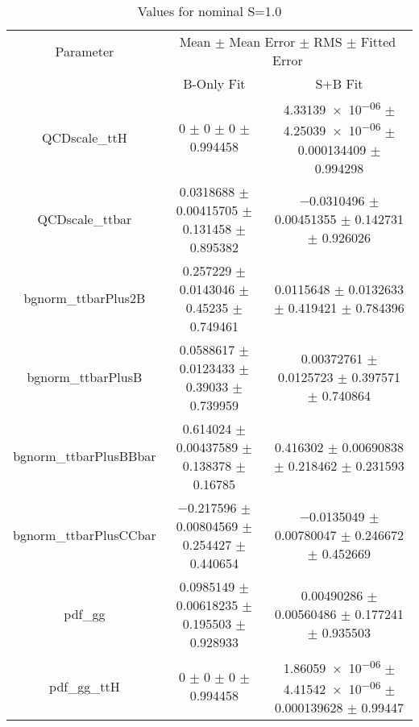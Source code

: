 \begin{table}
\centering
\caption{Values for nominal S=1.0}
\begin{tabular}{ccc}
\toprule
Parameter & \multicolumn{2}{c}{Mean $\pm$ Mean Error $\pm$ RMS $\pm$ Fitted Error}\\
 & B-Only Fit & S+B Fit\\
\midrule
QCDscale\_ttH & \num{0} $\pm$ \num{0} $\pm$ \num{0} $\pm$ \num{0.994458} & \num{4.33139e-06} $\pm$ \num{4.25039e-06} $\pm$ \num{0.000134409} $\pm$ \num{0.994298}\\
QCDscale\_ttbar & \num{0.0318688} $\pm$ \num{0.00415705} $\pm$ \num{0.131458} $\pm$ \num{0.895382} & \num{-0.0310496} $\pm$ \num{0.00451355} $\pm$ \num{0.142731} $\pm$ \num{0.926026}\\
bgnorm\_ttbarPlus2B & \num{0.257229} $\pm$ \num{0.0143046} $\pm$ \num{0.45235} $\pm$ \num{0.749461} & \num{0.0115648} $\pm$ \num{0.0132633} $\pm$ \num{0.419421} $\pm$ \num{0.784396}\\
bgnorm\_ttbarPlusB & \num{0.0588617} $\pm$ \num{0.0123433} $\pm$ \num{0.39033} $\pm$ \num{0.739959} & \num{0.00372761} $\pm$ \num{0.0125723} $\pm$ \num{0.397571} $\pm$ \num{0.740864}\\
bgnorm\_ttbarPlusBBbar & \num{0.614024} $\pm$ \num{0.00437589} $\pm$ \num{0.138378} $\pm$ \num{0.16785} & \num{0.416302} $\pm$ \num{0.00690838} $\pm$ \num{0.218462} $\pm$ \num{0.231593}\\
bgnorm\_ttbarPlusCCbar & \num{-0.217596} $\pm$ \num{0.00804569} $\pm$ \num{0.254427} $\pm$ \num{0.440654} & \num{-0.0135049} $\pm$ \num{0.00780047} $\pm$ \num{0.246672} $\pm$ \num{0.452669}\\
pdf\_gg & \num{0.0985149} $\pm$ \num{0.00618235} $\pm$ \num{0.195503} $\pm$ \num{0.928933} & \num{0.00490286} $\pm$ \num{0.00560486} $\pm$ \num{0.177241} $\pm$ \num{0.935503}\\
pdf\_gg\_ttH & \num{0} $\pm$ \num{0} $\pm$ \num{0} $\pm$ \num{0.994458} & \num{1.86059e-06} $\pm$ \num{4.41542e-06} $\pm$ \num{0.000139628} $\pm$ \num{0.99447}\\
\bottomrule
\end{tabular}
\end{table}
